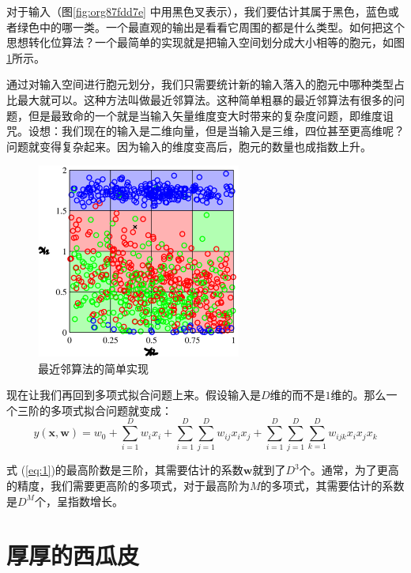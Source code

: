 \documentclass[10pt,a4paper,UTF8]{article}
\begin{document}
对于输入（图\ref{fig:org87fdd7e} 中用黑色叉表示），我们要估计其属于黑色，蓝色或者绿色中的哪一类。一个最直观的输出是看看它周围的都是什么类型。如何把这个思想转化位算法？一个最简单的实现就是把输入空间划分成大小相等的胞元，如图\ref{fig:orgc0c41b0}所示。

通过对输入空间进行胞元划分，我们只需要统计新的输入落入的胞元中哪种类型占比最大就可以。这种方法叫做最近邻算法。这种简单粗暴的最近邻算法有很多的问题，但是最致命的一个就是当输入矢量维度变大时带来的复杂度问题，即维度诅咒。设想：我们现在的输入是二维向量，但是当输入是三维，四位甚至更高维呢？问题就变得复杂起来。因为输入的维度变高后，胞元的数量也成指数上升。
\begin{figure}[htbp]
\centering
\includegraphics[width=0.6\textwidth]{../../img/computer_prml/20170503figure1dot20.png}
\caption{\label{fig:orgc0c41b0}
最近邻算法的简单实现}
\end{figure}


现在让我们再回到多项式拟合问题上来。假设输入是\(D\)维的而不是\(1\)维的。那么一个三阶的多项式拟合问题就变成：
\begin{equation}
\label{eq:1}
y(\mathbf{x}, \mathbf{w}) = w_{0} + \sum_{i=1}^{D}w_{i}x_{i} + \sum_{i=1}^{D}\sum_{j=1}^{D} w_{ij}x_{i}x_{j} + \sum_{i=1}^{D}\sum_{j=1}^{D}\sum_{k=1}^{D}w_{ijk}x_{i}x_{j}x_{k}
\end{equation}

式 (\ref{eq:1})的最高阶数是三阶，其需要估计的系数\(\mathbf{w}\)就到了\(D^{3}\)个。通常，为了更高的精度，我们需要更高阶的多项式，对于最高阶为\(M\)的多项式，其需要估计的系数是\(D^{M}\)个，呈指数增长。

\section{厚厚的西瓜皮}
\label{sec:org0060dab}
\end{document}

